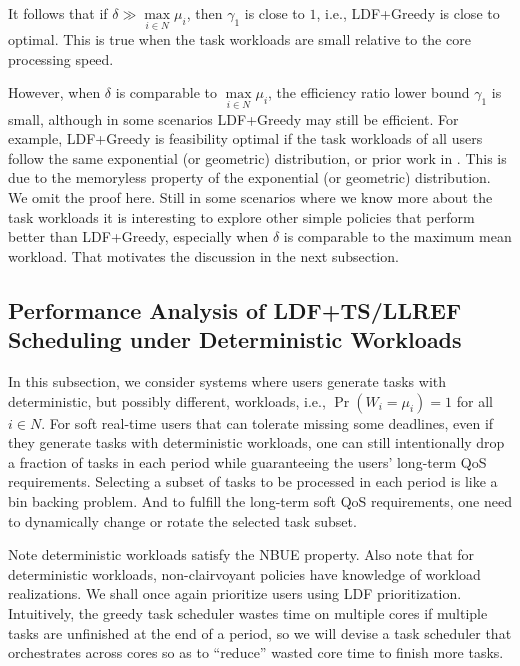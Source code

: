 \documentclass[prodmode,acmtompecs]{acmsmall}
\newcommand{\fullUserSet}{N}
\newcommand{\myComments}[1]{}
\newif\ifdissertation
\newcommand{\dissertationStart}{\ifdissertation  \myComments{Dissertation version: }}
\newcommand{\commentEnd}{\myComments{End}}
\begin{document}
\dissertationStart
Intuitively, $\frac{\max\limits_{i\in \fullUserSet} \mu_i}{\delta}$ represents the worst case ratio of wasted resources (core time) $m\max\limits_{i\in \fullUserSet} \mu_i$ under LDF+Greedy to the total available resources $m\delta$. 
\commentEnd\fi

It follows that if $\delta \gg \max\limits_{i\in \fullUserSet} \mu_i$, then $\gamma_1$ is close to $1$, i.e., LDF+Greedy is close to optimal. This is true when the task workloads are small relative to the core processing speed. 

However, when $\delta$ is comparable to $\max\limits_{i\in \fullUserSet} \mu_i$, the efficiency ratio lower bound $\gamma_1$ is small, 
although in some scenarios LDF+Greedy may still be efficient. For example, LDF+Greedy is feasibility optimal if the task workloads of all users follow the same exponential (or geometric) distribution, 
or prior work in \cite{HoK12}. 
This is due to the memoryless property of the exponential (or geometric) distribution. 
We omit the proof here. 
Still in some scenarios where we know more about the task workloads it is interesting to explore other simple policies that perform better than LDF+Greedy, especially when $\delta$ is comparable to the maximum mean workload. That motivates the discussion in the next subsection. 

\subsection{Performance Analysis of LDF+TS/LLREF Scheduling under Deterministic Workloads}
\label{subsection_LDF_TS_LLREF}
In this subsection, we consider systems where users generate tasks with deterministic, but possibly different, workloads, i.e., $\Pr(W_i = \mu_i) = 1$ for all $i\in \fullUserSet$. 
For soft real-time users that can tolerate missing some deadlines, even if they generate tasks with deterministic workloads, one can still intentionally drop a fraction of tasks in each period while guaranteeing the users' long-term QoS requirements. 
Selecting a subset of tasks to be processed in each period is like a bin backing problem. And to fulfill the long-term soft QoS requirements, one need to dynamically change or rotate the selected task subset. 


Note deterministic workloads satisfy the NBUE property. Also note that for deterministic workloads, non-clairvoyant policies have knowledge of workload realizations. 
We shall once again prioritize users using LDF prioritization. 
Intuitively, the greedy task scheduler wastes time on multiple cores if multiple tasks are unfinished at the end of a period, so we will devise a task scheduler that orchestrates across cores so as to ``reduce'' wasted core time to finish more tasks. 
\end{document}

